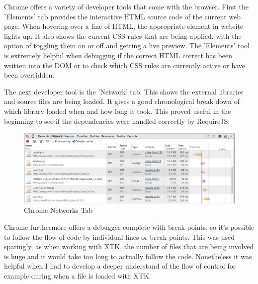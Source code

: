 \documentclass[a4paper,11pt,titlepage]{article}
\begin{document}
Chrome offers a variety of developer tools that come with the browser. First the 'Elements' tab provides the interactive HTML source code of the current web page. When hovering over a line of HTML, the appropriate element in website lights up. It also shows the current CSS rules that are being applied, with the option of toggling them on or off and getting a live preview. The 'Elements' tool is extremely helpful when debugging if the correct HTML correct has been written into the DOM or to check which CSS rules are currently active or have been overridden.


The next developer tool is the 'Network' tab. This shows the external libraries and source files are being loaded. It gives a good chronological break down of which library loaded when and how long it took. This proved useful in the beginning to see if the dependencies were handled correctly by RequireJS.

\begin{figure}[ht!]
\centering
\includegraphics[width=140mm]{graphics/chromeNetwork_01.png}
\caption{Chrome Networks Tab}
\label{fig:UIdesign1}
\end{figure}


Chrome furthermore offers a debugger complete with break points, so it's possible to follow the flow of code  by individual lines or break points. This was used sparingly, as when working with XTK, the number of files that are being involved is huge and it would take too long to actually follow the code. Nonetheless it was helpful when I had to develop a deeper understand of the flow of control for example during when a file is loaded with XTK.
\end{document}
